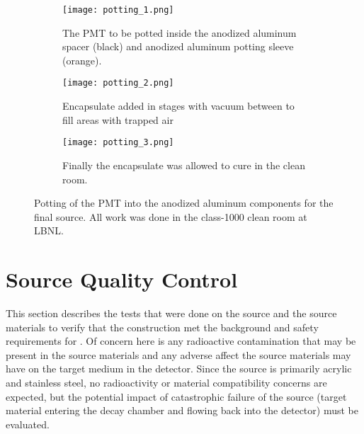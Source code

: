 \begin{figure}
\begin{subfigure}{.385\textwidth}
  \texttt{[image: potting\_1.png]}
  \caption{The PMT to be potted inside the anodized aluminum spacer (black) and anodized aluminum potting sleeve (orange).}
  \label{fig:potting_a}
\end{subfigure}
\begin{subfigure}{.305\textwidth}
  \texttt{[image: potting\_2.png]}
  \caption{Encapsulate added in stages with vacuum between to fill areas with trapped air}
  \label{fig:potting_b}
\end{subfigure}
\begin{subfigure}{.29\textwidth}
  \texttt{[image: potting\_3.png]}
  \caption{Finally the encapsulate was allowed to cure in the clean room.}
  \label{fig:potting_c}
\end{subfigure}
\caption{Potting of the PMT into the anodized aluminum components for the final source. All work was done in the class-1000 clean room at LBNL.}
\label{fig:potting}
\end{figure}

\section{Source Quality Control}
\label{chap:tests}

This section describes the tests that were done on the source and the source materials to verify that the construction met the background and safety requirements for {\snop}. 
Of concern here is any radioactive contamination that may be present in the source materials and any adverse affect the source materials may have on the target medium in the detector.
Since the source is primarily acrylic and stainless steel, no radioactivity or material compatibility concerns are expected, but the potential impact of catastrophic failure of the source (target material entering the decay chamber and flowing back into the detector) must be evaluated.

